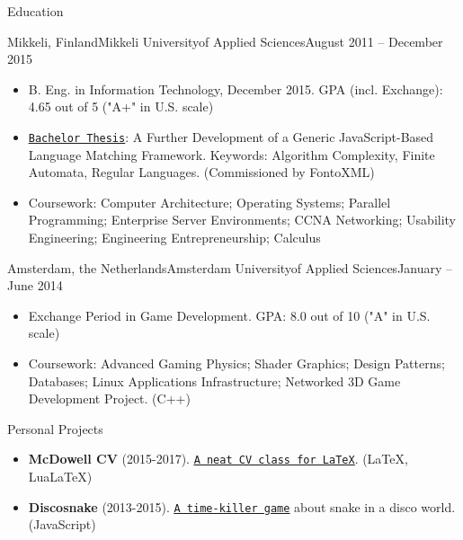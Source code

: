 \documentclass[calibri]{mcdowellcv}
\newcommand{\ultthref}[2]{\href{#1}{\underline{\texttt{#2}}}}
\begin{document}
	\begin{cvsection}{Education}
		\begin{cvsubsection}[2]{Mikkeli, Finland}{Mikkeli University\linebreak of Applied Sciences}{August 2011 -- December 2015}	
			\begin{itemize}
				\item B. Eng. in Information Technology, December 2015. GPA (incl. Exchange): 4.65 out of 5 ("A+" in U.S. scale)
				\item \ultthref{http://urn.fi/URN:NBN:fi:amk-2015120118713}{Bachelor Thesis}: A Further Development of a Generic JavaScript-Based Language Matching Framework. Keywords: Algorithm Complexity, Finite Automata, Regular Languages. (Commissioned by FontoXML)
				\item Coursework: Computer Architecture; Operating Systems; Parallel Programming; Enterprise Server Environments; CCNA Networking; Usability Engineering; Engineering Entrepreneurship; Calculus
			\end{itemize}
		\end{cvsubsection}
		
		\begin{cvsubsection}[2]{Amsterdam, the Netherlands}{Amsterdam University\linebreak of Applied Sciences}{January -- June 2014}
			\begin{itemize}
				\item Exchange Period in Game Development. GPA: 8.0 out of 10 ("A" in U.S. scale)
				\item Coursework: Advanced Gaming Physics; Shader Graphics; Design Patterns; Databases; Linux Applications Infrastructure; Networked 3D Game Development Project. (C++)
			\end{itemize}
		\end{cvsubsection}
	\end{cvsection}
	
	\begin{cvsection}{Personal Projects}	
          \begin{cvsubsection}{}{}{}
		\begin{itemize}
			\item \textbf{McDowell CV} (2015-2017). \ultthref{https://github.com/dnl-blkv/mcdowell-cv}{A neat CV class for LaTeX}. (LaTeX, LuaLaTeX)
			\item \textbf{Discosnake} (2013-2015). \ultthref{http://discosnake.com/}{A time-killer game} about snake in a disco world. (JavaScript)
		\end{itemize}
	\end{cvsubsection}
	\end{cvsection}
\end{document}
